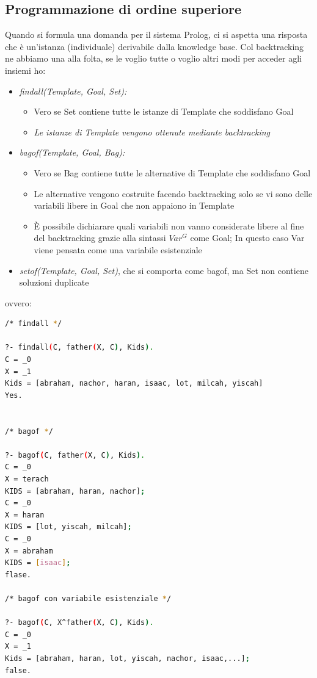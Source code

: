 \documentclass[a4paper,12pt, oneside]{book}
\begin{document}
\subsection{Programmazione di ordine superiore}
Quando si formula una domanda per il sistema Prolog, ci si
aspetta una risposta che è un'istanza (individuale) derivabile dalla knowledge base. Col backtracking ne abbiamo una alla folta, se le voglio tutte o voglio altri modi per acceder agli insiemi ho:
\begin{itemize}
	\item \textit{findall(Template, Goal, Set):}
	      \begin{itemize}
		      \item Vero se Set contiene tutte le istanze di Template che soddisfano Goal
		      \item \textit{Le istanze di Template vengono ottenute mediante backtracking}
	      \end{itemize}
	\item \textit{bagof(Template, Goal, Bag):}
	      \begin{itemize}
		      \item Vero se Bag contiene tutte le alternative di Template che soddisfano Goal
		      \item Le alternative vengono costruite facendo backtracking solo se vi sono delle variabili libere in Goal che non appaiono in Template
		      \item È possibile dichiarare quali variabili non vanno considerate libere al fine del backtracking grazie alla sintassi $Var^G$ come Goal; In questo caso Var viene pensata come una variabile esistenziale
	      \end{itemize}
	\item \textit{setof(Template, Goal, Set)}, che si comporta come bagof, ma Set non contiene soluzioni duplicate
\end{itemize}
\newpage
ovvero:
\begin{shaded}
	\begin{lstlisting}[language=bash]
/* findall */

?- findall(C, father(X, C), Kids).
C = _0
X = _1
Kids = [abraham, nachor, haran, isaac, lot, milcah, yiscah]
Yes.


/* bagof */

?- bagof(C, father(X, C), Kids).
C = _0
X = terach
KIDS = [abraham, haran, nachor];
C = _0
X = haran
KIDS = [lot, yiscah, milcah];
C = _0
X = abraham
KIDS = [isaac];
flase.

/* bagof con variabile esistenziale */

?- bagof(C, X^father(X, C), Kids).
C = _0
X = _1
Kids = [abraham, haran, lot, yiscah, nachor, isaac,...];
false.
\end{lstlisting}
\end{shaded}
\newpage
\end{document}
